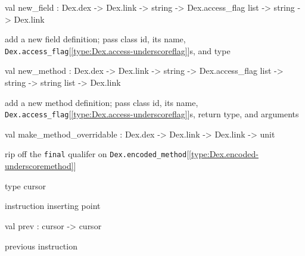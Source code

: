 \documentclass[11pt]{article}
\begin{document}
\label{val:Modify.new-underscorefield}\begin{ocamldoccode}
val new_field :
  Dex.dex -> Dex.link -> string -> Dex.access_flag list -> string -> Dex.link
\end{ocamldoccode}
\begin{ocamldocdescription}
add a new field definition;
 pass class id, its name, {\tt{Dex.access\_flag}}[\ref{type:Dex.access-underscoreflag}]s, and type


\end{ocamldocdescription}




\label{val:Modify.new-underscoremethod}\begin{ocamldoccode}
val new_method :
  Dex.dex ->
  Dex.link ->
  string -> Dex.access_flag list -> string -> string list -> Dex.link
\end{ocamldoccode}
\begin{ocamldocdescription}
add a new method definition;
 pass class id, its name, {\tt{Dex.access\_flag}}[\ref{type:Dex.access-underscoreflag}]s, return type, and arguments


\end{ocamldocdescription}




\label{val:Modify.make-underscoremethod-underscoreoverridable}\begin{ocamldoccode}
val make_method_overridable : Dex.dex -> Dex.link -> Dex.link -> unit
\end{ocamldoccode}
\begin{ocamldocdescription}
rip off the {\tt{final}} qualifer on {\tt{Dex.encoded\_method}}[\ref{type:Dex.encoded-underscoremethod}]


\end{ocamldocdescription}




\label{type:Modify.cursor}\begin{ocamldoccode}
type cursor 
\end{ocamldoccode}
\begin{ocamldocdescription}
instruction inserting point


\end{ocamldocdescription}




\label{val:Modify.prev}\begin{ocamldoccode}
val prev : cursor -> cursor
\end{ocamldoccode}
\begin{ocamldocdescription}
previous instruction


\end{ocamldocdescription}
\end{document}
